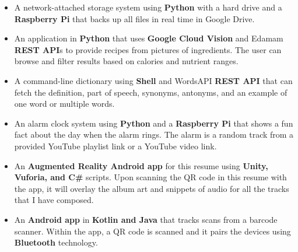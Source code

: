 
\begin{cvvols}
{\paragraphstyle \justify
\begin{itemize}[leftmargin=2ex]
\item A network-attached storage system using \textbf{Python} with a hard drive and a \textbf{Raspberry Pi} that backs up all files in real time in Google Drive.
\vspace{-1mm}
\item An application in \textbf{Python} that uses \textbf{Google Cloud Vision} and Edamam \textbf{REST API}s to provide recipes from pictures of ingredients. The user can browse and filter results based on calories and nutrient ranges.
\vspace{-1mm}
\item A command-line dictionary using \textbf{Shell} and WordsAPI \textbf{REST API} that can fetch the definition, part of speech, synonyms, antonyms, and an example of one word or multiple words.
\vspace{-1mm}
\item An alarm clock system using \textbf{Python} and a \textbf{Raspberry Pi} that shows a fun fact about the day when the alarm rings. The alarm is a random track from a provided YouTube playlist link or a YouTube video link.
\vspace{-1mm}
\item An \textbf{Augmented Reality Android app} for this resume using \textbf{Unity, Vuforia, and C\#} scripts. Upon scanning the QR code in this resume with the app, it will overlay the album art and snippets of audio for all the tracks that I have composed.
\vspace{-1mm}
\item An \textbf{Android app} in \textbf{Kotlin and Java} that tracks scans from a barcode scanner. Within the app, a QR code is scanned and it pairs the devices using \textbf{Bluetooth} technology.

\end{itemize}}
\end{cvvols}
